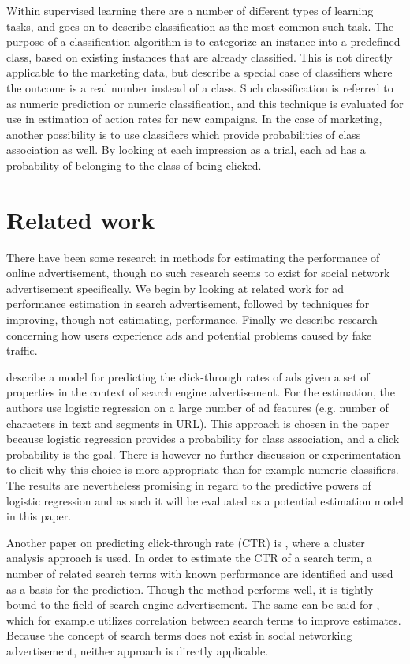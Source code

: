 \documentclass{sig-alternate}
\begin{document}
Within supervised learning there are a number of different types of learning tasks, and \cite{Kantardzic2011} goes on to describe classification as the most common such task. The purpose of a classification algorithm is to categorize an instance into a predefined class, based on existing instances that are already classified. This is not directly applicable to the marketing data, but \citep{Witten2011} describe a special case of classifiers where the outcome is a real number instead of a class. Such classification is referred to as numeric prediction or numeric classification, and this technique is evaluated for use in estimation of action rates for new campaigns. In the case of marketing, another possibility is to use classifiers which provide probabilities of class association as well. By looking at each impression as a trial, each ad has a probability of belonging to the class of being clicked.

\section{Related work}
\label{ch:RelatedWorks}
There have been some research in methods for estimating the performance of online advertisement, though no such research seems to exist for social network advertisement specifically. We begin by looking at related work for ad performance estimation in search advertisement, followed by techniques for improving, though not estimating, performance. Finally we describe research concerning how users experience ads and potential problems caused by fake traffic.

\cite{Richardson2007} describe a model for predicting the click-through rates of ads given a set of properties in the context of search engine advertisement. For the estimation, the authors use logistic regression on a large number of ad features (e.g. number of characters in text and segments in URL). This approach is chosen in the paper because logistic regression provides a probability for class association, and a click probability is the goal. There is however no further discussion or experimentation to elicit why this choice is more appropriate than for example numeric classifiers. The results are nevertheless promising in regard to the predictive powers of logistic regression and as such it will be evaluated as a potential estimation model in this paper.

Another paper on predicting click-through rate (CTR) is \cite{Regelson2006}, where a cluster analysis approach is used. In order to estimate the CTR of a search term, a number of related search terms with known performance are identified and used as a basis for the prediction. Though the method performs well, it is tightly bound to the field of search engine advertisement. The same can be said for \cite{Richardson2007}, which for example utilizes correlation between search terms to improve estimates. Because the concept of search terms does not exist in social networking advertisement, neither approach is directly applicable.
\end{document}
